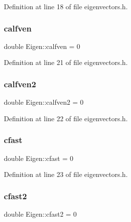 Definition at line 18 of file eigenvectors.\+h.

\mbox{\label{classEigen_a637fc44639e37dd0d9edd0ab764462db}} 
\subsubsection{\texorpdfstring{calfven}{calfven}}
{\footnotesize\ttfamily double Eigen\+::calfven = 0\hspace{0.3cm}{\ttfamily [private]}}



Definition at line 21 of file eigenvectors.\+h.

\mbox{\label{classEigen_ace4b096410afc73f6e01f5e97f121a45}} 
\subsubsection{\texorpdfstring{calfven2}{calfven2}}
{\footnotesize\ttfamily double Eigen\+::calfven2 = 0\hspace{0.3cm}{\ttfamily [private]}}



Definition at line 22 of file eigenvectors.\+h.

\mbox{\label{classEigen_abbcac99d3d2325b60ddfb7240bde9464}} 
\subsubsection{\texorpdfstring{cfast}{cfast}}
{\footnotesize\ttfamily double Eigen\+::cfast = 0\hspace{0.3cm}{\ttfamily [private]}}



Definition at line 23 of file eigenvectors.\+h.

\mbox{\label{classEigen_ae7cb990b9abbfa7412648bd1ee472a29}} 
\subsubsection{\texorpdfstring{cfast2}{cfast2}}
{\footnotesize\ttfamily double Eigen\+::cfast2 = 0\hspace{0.3cm}{\ttfamily [private]}}



